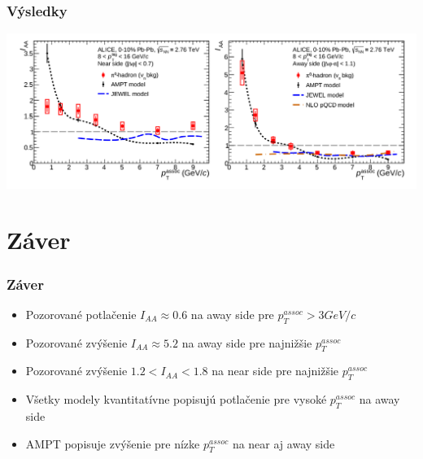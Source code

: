 \documentclass{beamer}
\begin{document}
	\begin{frame}
		\frametitle{Výsledky}
		\centering \includegraphics[scale=0.3]{./Obrazky/MC.png}
	\end{frame}
	
	\section{Záver}
	\begin{frame}
		\frametitle{Záver}
		\begin{itemize}
		 \item Pozorované potlačenie $I_{AA}\approx0.6$ na away side pre $p_T^{assoc}>3GeV/c$ 
		 \item Pozorované zvýšenie $I_{AA}\approx5.2$ na away side pre najnižšie $p_T^{assoc}$ 
		 \item Pozorované zvýšenie $1.2<I_{AA}<1.8$ na near side pre najnižšie $p_T^{assoc}$ 
		 \item Všetky modely kvantitatívne popisujú potlačenie pre vysoké $p_T^{assoc}$  na away side
		 \item AMPT popisuje zvýšenie pre nízke $p_T^{assoc}$ na near aj away side
		\end{itemize}

	\end{frame}
	
\end{document}

